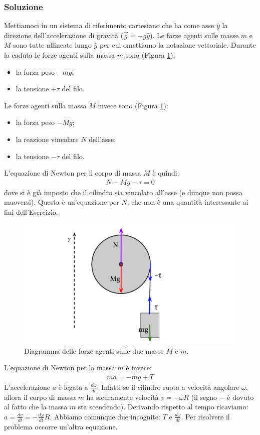 \documentclass[12pt,a4paper]{book}
\begin{document}
\subsubsection*{Soluzione}
Mettiamoci in un sistema di riferimento cartesiano che ha come asse $\hat{y}$ la direzione dell'accelerazione di gravità
($\vec{g}=-g\hat{y}$). Le forze agenti sulle masse $m$ e $M$ sono tutte allineate lungo $\hat{y}$ per cui omettiamo la notazione vettoriale.
Durante la caduta le forze agenti sulla massa $m$ sono (Figura \ref{fig:5-e-1-2}):
\begin{itemize}
\item la forza peso $-mg$;
\item la tensione $+\tau$ del filo.
\end{itemize}
Le forze agenti sulla massa $M$ invece sono (Figura \ref{fig:5-e-1-2}):
\begin{itemize}
\item la forza peso $-Mg$;
\item la reazione vincolare $N$ dell'asse;
\item la tensione $-\tau$ del filo.
\end{itemize}
L'equazione di Newton per il corpo di massa $M$ è quindi:
\begin{gather*}
N-Mg-\tau=0 
\end{gather*}
dove si è già imposto che il cilindro sia vincolato all'asse (e dunque non possa muoversi). Questa è un'equazione per $N$, che non è una quantità 
interessante ai fini dell'Esercizio. 

\begin{figure}[!ht]
 \centering
\includegraphics[scale=0.45]{e-1-2.pdf}
\caption{Diagramma delle forze agenti sulle due masse $M$ e $m$. \label{fig:5-e-1-2} }
\end{figure}
L'equazione di Newton per la massa $m$ è invece:
\begin{gather*}
ma=-mg + T
\end{gather*}
L'accelerazione $a$ è legata a $\frac{d\omega}{dt}$. Infatti se il cilindro ruota a velocità angolare $\omega$, 
allora il corpo di massa $m$ ha sicuramente velocità $v=-\omega R$ (il segno $-$ è dovuto al fatto che la massa $m$ sta scendendo).
Derivando rispetto al tempo ricaviamo: $a=\frac{dv}{dt}=-\frac{d\omega}{dt}  R$. 
Abbiamo comunque due incognite: $T$ e $\frac{d\omega}{dt}$. Per risolvere il problema occorre un'altra equazione.\\
\end{document}
